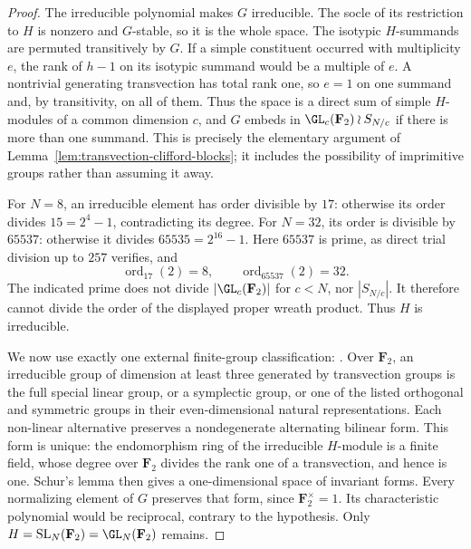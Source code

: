 \begin{proof}
The irreducible polynomial makes $G$ irreducible.  The socle of its
restriction to $H$ is nonzero and $G$-stable, so it is the whole
space.  The isotypic $H$-summands are permuted transitively by $G$.
If a simple constituent occurred with multiplicity $e$, the rank
of $h-1$ on its isotypic summand would be a multiple of $e$.
A nontrivial generating transvection has total rank one, so
$e=1$ on one summand and, by transitivity, on all of them.
Thus the space is a direct sum of simple $H$-modules of a common
dimension $c$, and $G$ embeds in
$\GL_c(\mathbf F_2)\wr S_{N/c}$ if there is more than one summand.
This is precisely the elementary argument of
Lemma~\ref{lem:transvection-clifford-blocks}; it includes the
possibility of imprimitive groups rather than assuming it away.

For $N=8$, an irreducible element has order divisible by $17$:
otherwise its order divides $15=2^4-1$, contradicting its degree.
For $N=32$, its order is divisible by $65537$: otherwise it divides
$65535=2^{16}-1$.  Here $65537$ is prime, as direct trial division
up to $257$ verifies, and
\[
 \operatorname{ord}_{17}(2)=8,\qquad
 \operatorname{ord}_{65537}(2)=32.
\]
The indicated prime does not divide $|\GL_c(\mathbf F_2)|$ for
$c<N$, nor $|S_{N/c}|$.  It therefore cannot divide the order of
the displayed proper wreath product.  Thus $H$ is irreducible.

We now use exactly one external finite-group classification:
\cite[Theorem~3.6, printed p.~22]{KantorSeress2001}.
Over $\mathbf F_2$, an irreducible group of dimension at least three
generated by transvection groups is the full special linear group,
or a symplectic group, or one of the listed orthogonal and symmetric
groups in their even-dimensional natural representations.
Each non-linear alternative preserves a nondegenerate alternating
bilinear form.  This form is unique: the endomorphism ring of the
irreducible $H$-module is a finite field, whose degree over
$\mathbf F_2$ divides the rank one of a transvection, and hence is
one.  Schur's lemma then gives a one-dimensional space of invariant
forms.  Every normalizing element of $G$ preserves that form, since
$\mathbf F_2^\times=1$.  Its characteristic polynomial would be
reciprocal, contrary to the hypothesis.  Only
$H=\mathrm{SL}_N(\mathbf F_2)=\GL_N(\mathbf F_2)$ remains.
\end{proof}

